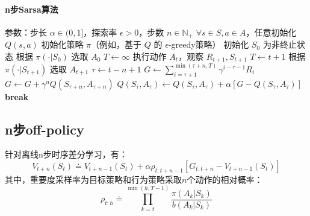 \documentclass[
12pt, %
a4paper, 
oneside, %
headinclude,footinclude, %
]{scrartcl}
\begin{document}
\paragraph{n步Sarsa算法}
\begin{myalgorithm}[n步Sarsa算法]
\State 参数：步长 $\alpha \in (0,1]$，探索率 $\epsilon > 0$，步数 $n \in \mathbb{N}_+$
\State $\forall s \in S, a \in A$，任意初始化 $Q(s, a)$
\State 初始化策略 $\pi$（例如，基于 $Q$ 的 $\epsilon$-greedy策略）
    \State 初始化 $S_0$ 为非终止状态
    \State 根据 $\pi(\cdot|S_0)$ 选取 $A_0$
    \State $T \gets \infty$
            \State 执行动作 $A_t$，观察 $R_{t+1}, S_{t+1}$
                \State $T \gets t+1$
            \Else
                \State 根据 $\pi(\cdot|S_{t+1})$ 选取 $A_{t+1}$
            \EndIf
        \EndIf
        \State $\tau \gets t-n+1$ 
            \State $G \gets \sum_{i=\tau+1}^{\min(\tau+n,T)} \gamma^{i-\tau-1}R_i$
                \State $G \gets G + \gamma^n Q(S_{\tau+n}, A_{\tau+n})$
            \EndIf
            \State $Q(S_{\tau},A_{\tau}) \gets Q(S_{\tau},A_{\tau}) + \alpha[G - Q(S_{\tau},A_{\tau})]$
        \EndIf
            \State \textbf{break}
        \EndIf
    \EndFor
\EndFor
\end{myalgorithm}
\subsection{n步off-policy}
针对离线n步时序差分学习，有：
$$ V_{t + n}(S_t) \doteq V_{t + n - 1}(S_t) + \alpha \rho_{t:t + n - 1}[G_{t:t + n} - V_{t + n - 1}(S_t)] $$
其中，重要度采样率为目标策略和行为策略采取$ n $个动作的相对概率：
$$ \rho_{t:h} \doteq \prod_{k = t}^{\min(h, T - 1)} \frac{\pi(A_k|S_k)}{b(A_k|S_k)} $$
\end{document}
